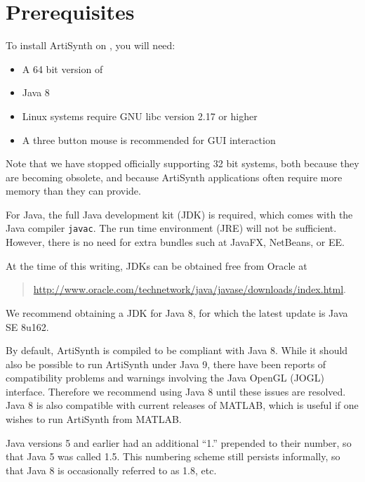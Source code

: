 \section{Prerequisites}

To install ArtiSynth on \SYSTEM{}, you will need:

\begin{itemize}

\item A 64 bit version of \SYSTEM{}

\item Java 8

\item Linux systems require GNU libc version 2.17 or higher

\item A three button mouse is recommended for GUI interaction

\end{itemize}

Note that we have stopped officially supporting 32 bit systems, both
because they are becoming obsolete, and because ArtiSynth applications
often require more memory than they can provide.

For Java, the full Java development kit (JDK) is required, which comes
with the Java compiler {\tt javac}. The run time environment (JRE)
will not be sufficient. However, there is no need for extra bundles
such at JavaFX, NetBeans, or EE.

At the time of this writing, JDKs can be obtained free from Oracle at
\begin{quote}
\href{http://www.oracle.com/technetwork/java/javase/downloads/index.html}%
{http://www.oracle.com/technetwork/java/javase/downloads/index.html}.
\end{quote}
We recommend obtaining a JDK for Java 8, for which the latest update
is Java SE 8u162.

\begin{sideblock}
By default, ArtiSynth is compiled to be compliant with Java 8. While
it should also be possible to run ArtiSynth under Java 9, there have
been reports of compatibility problems and warnings involving the Java
OpenGL (JOGL) interface. Therefore we recommend using Java 8 until
these issues are resolved. Java 8 is also compatible with current
releases of MATLAB, which is useful if one wishes to run ArtiSynth
from MATLAB.
\end{sideblock}

\begin{sideblock}
Java versions 5 and earlier had an additional ``1.'' prepended to
their number, so that Java 5 was called 1.5. This numbering scheme
still persists informally, so that Java 8 is occasionally referred to
as 1.8, etc.
\end{sideblock}
 
